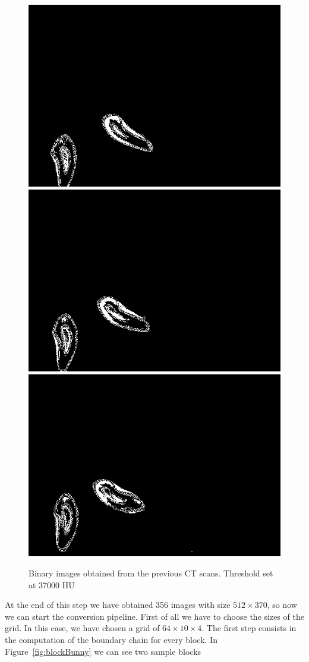 \begin{figure}[htb] %
   \centering
   \includegraphics[width=0.30\linewidth]{images/thrBunny0.png}\hfill
   \includegraphics[width=0.30\linewidth]{images/thrBunny1.png}\hfill
   \includegraphics[width=0.30\linewidth]{images/thrBunny2.png}
   \caption[Binary images obtained from the previous CT scans]{Binary images obtained from the previous CT scans. Threshold set at 37000 HU}
   \label{fig:thrBunny}
\end{figure}

At the end of this step we have obtained 356 images with size $512\times370$, so now we can start the conversion pipeline. First of all we have to choose the sizes of the grid. In this case, we have chosen a grid of $64\times10\times4$. The first step consists in the computation of the boundary chain for every block. In Figure~\ref{fig:blockBunny} we can see two sample blocks

